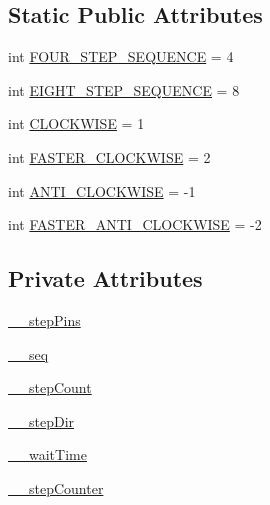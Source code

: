 \subsection*{Static Public Attributes}
\begin{DoxyCompactItemize}
\item 
int \hyperlink{classlibsensorPy_1_1concreteactuator_1_1stepper28BJY48_1_1Stepper28BJY48_a41c8687b2722d0aca86da571f1850abb}{F\+O\+U\+R\+\_\+\+S\+T\+E\+P\+\_\+\+S\+E\+Q\+U\+E\+N\+C\+E} = 4
\item 
int \hyperlink{classlibsensorPy_1_1concreteactuator_1_1stepper28BJY48_1_1Stepper28BJY48_a9e04c4ae64805f1ab1eef5297c8c5683}{E\+I\+G\+H\+T\+\_\+\+S\+T\+E\+P\+\_\+\+S\+E\+Q\+U\+E\+N\+C\+E} = 8
\item 
int \hyperlink{classlibsensorPy_1_1concreteactuator_1_1stepper28BJY48_1_1Stepper28BJY48_a43b3ad7057da5fe550b177ced9472b5f}{C\+L\+O\+C\+K\+W\+I\+S\+E} = 1
\item 
int \hyperlink{classlibsensorPy_1_1concreteactuator_1_1stepper28BJY48_1_1Stepper28BJY48_af6651f4a535318f678bf39536773dcd8}{F\+A\+S\+T\+E\+R\+\_\+\+C\+L\+O\+C\+K\+W\+I\+S\+E} = 2
\item 
int \hyperlink{classlibsensorPy_1_1concreteactuator_1_1stepper28BJY48_1_1Stepper28BJY48_a4d60a5bd8604341cda9315fcb056a629}{A\+N\+T\+I\+\_\+\+C\+L\+O\+C\+K\+W\+I\+S\+E} = -\/1
\item 
int \hyperlink{classlibsensorPy_1_1concreteactuator_1_1stepper28BJY48_1_1Stepper28BJY48_a7cd6b937c5786ffd9ecca10e22c5186e}{F\+A\+S\+T\+E\+R\+\_\+\+A\+N\+T\+I\+\_\+\+C\+L\+O\+C\+K\+W\+I\+S\+E} = -\/2
\end{DoxyCompactItemize}
\subsection*{Private Attributes}
\begin{DoxyCompactItemize}
\item 
\hyperlink{classlibsensorPy_1_1concreteactuator_1_1stepper28BJY48_1_1Stepper28BJY48_a285c2f39b2647c376e0feaaf9644d163}{\+\_\+\+\_\+step\+Pins}
\item 
\hyperlink{classlibsensorPy_1_1concreteactuator_1_1stepper28BJY48_1_1Stepper28BJY48_a823b23fe1a08d96e8eb14a83ca588ef7}{\+\_\+\+\_\+seq}
\item 
\hyperlink{classlibsensorPy_1_1concreteactuator_1_1stepper28BJY48_1_1Stepper28BJY48_a11b1338ca5b876d8f4d644e8ecbe3241}{\+\_\+\+\_\+step\+Count}
\item 
\hyperlink{classlibsensorPy_1_1concreteactuator_1_1stepper28BJY48_1_1Stepper28BJY48_ac03b529f8571f215720f552da4b70ec6}{\+\_\+\+\_\+step\+Dir}
\item 
\hyperlink{classlibsensorPy_1_1concreteactuator_1_1stepper28BJY48_1_1Stepper28BJY48_a30eb354a022fa27ece9f56fdcfe595a5}{\+\_\+\+\_\+wait\+Time}
\item 
\hyperlink{classlibsensorPy_1_1concreteactuator_1_1stepper28BJY48_1_1Stepper28BJY48_ab9b622928ea78a8e38236c2c659e5bd3}{\+\_\+\+\_\+step\+Counter}
\end{DoxyCompactItemize}


